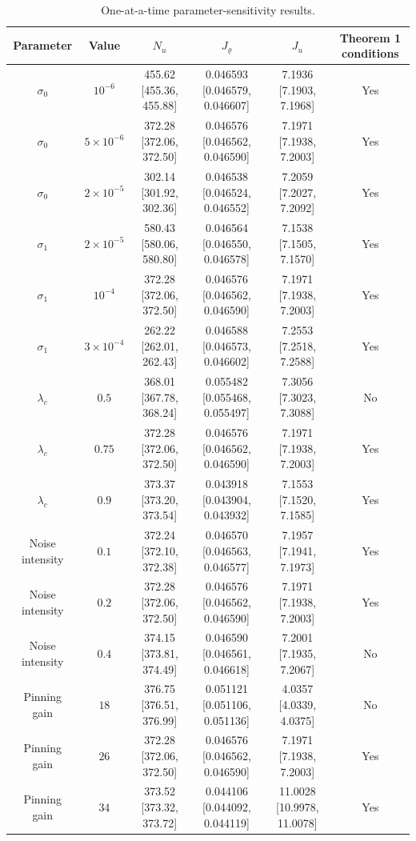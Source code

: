 \begin{table}[H]
\centering
\setlength{\tabcolsep}{3pt}
\caption{One-at-a-time parameter-sensitivity results.}\label{tab:parameter_sensitivity}
\scriptsize
\begin{tabular}{cccccc}
\toprule
Parameter & Value & $N_u$ & $J_\varrho$ & $J_u$ & Theorem 1 conditions \\
\midrule
$\sigma_0$ & $10^{-6}$ & 455.62 [455.36, 455.88] & 0.046593 [0.046579, 0.046607] & 7.1936 [7.1903, 7.1968] & Yes \\
$\sigma_0$ & $5\times10^{-6}$ & 372.28 [372.06, 372.50] & 0.046576 [0.046562, 0.046590] & 7.1971 [7.1938, 7.2003] & Yes \\
$\sigma_0$ & $2\times10^{-5}$ & 302.14 [301.92, 302.36] & 0.046538 [0.046524, 0.046552] & 7.2059 [7.2027, 7.2092] & Yes \\
$\sigma_1$ & $2\times10^{-5}$ & 580.43 [580.06, 580.80] & 0.046564 [0.046550, 0.046578] & 7.1538 [7.1505, 7.1570] & Yes \\
$\sigma_1$ & $10^{-4}$ & 372.28 [372.06, 372.50] & 0.046576 [0.046562, 0.046590] & 7.1971 [7.1938, 7.2003] & Yes \\
$\sigma_1$ & $3\times10^{-4}$ & 262.22 [262.01, 262.43] & 0.046588 [0.046573, 0.046602] & 7.2553 [7.2518, 7.2588] & Yes \\
$\lambda_c$ & $0.5$ & 368.01 [367.78, 368.24] & 0.055482 [0.055468, 0.055497] & 7.3056 [7.3023, 7.3088] & No \\
$\lambda_c$ & $0.75$ & 372.28 [372.06, 372.50] & 0.046576 [0.046562, 0.046590] & 7.1971 [7.1938, 7.2003] & Yes \\
$\lambda_c$ & $0.9$ & 373.37 [373.20, 373.54] & 0.043918 [0.043904, 0.043932] & 7.1553 [7.1520, 7.1585] & Yes \\
Noise intensity & $0.1$ & 372.24 [372.10, 372.38] & 0.046570 [0.046563, 0.046577] & 7.1957 [7.1941, 7.1973] & Yes \\
Noise intensity & $0.2$ & 372.28 [372.06, 372.50] & 0.046576 [0.046562, 0.046590] & 7.1971 [7.1938, 7.2003] & Yes \\
Noise intensity & $0.4$ & 374.15 [373.81, 374.49] & 0.046590 [0.046561, 0.046618] & 7.2001 [7.1935, 7.2067] & No \\
Pinning gain & $18$ & 376.75 [376.51, 376.99] & 0.051121 [0.051106, 0.051136] & 4.0357 [4.0339, 4.0375] & No \\
Pinning gain & $26$ & 372.28 [372.06, 372.50] & 0.046576 [0.046562, 0.046590] & 7.1971 [7.1938, 7.2003] & Yes \\
Pinning gain & $34$ & 373.52 [373.32, 373.72] & 0.044106 [0.044092, 0.044119] & 11.0028 [10.9978, 11.0078] & Yes \\
\bottomrule
\end{tabular}
\end{table}
